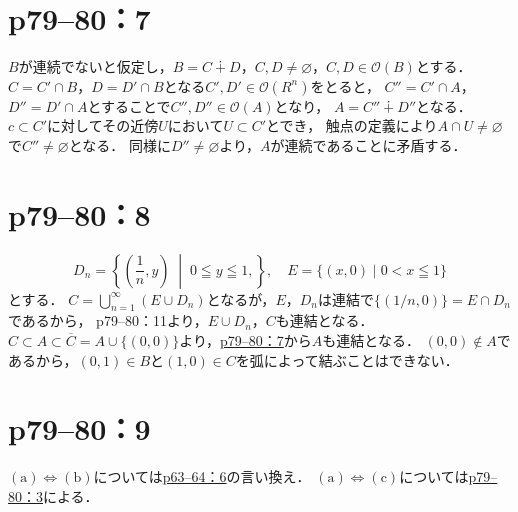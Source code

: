 \section*{p79--80：7} \label{p79--80：7}
\begin{tproof}
    $B$が連続でないと仮定し，$B=C\dotplus D$，$C, D \neq \varnothing$，$C,D\in \mathcal{O}(B)$とする．
    $C=C'\cap B$，$D=D'\cap B$となる$C',D'\in \mathcal{O}(R^n)$をとると，
    $C''=C'\cap A$，$D''=D'\cap A$とすることで$C'',D''\in \mathcal{O}(A)$となり，
    $A=C''\dotplus D''$となる．
    $c \subset C'$に対してその近傍$U$において$U\subset C'$とでき，
    触点の定義により$A\cap U\neq \varnothing$で$C''\neq \varnothing$となる．
    同様に$D''\neq \varnothing$より，$A$が連続であることに矛盾する．
\end{tproof}

\section*{p79--80：8}
\begin{tanswer}
    \[
        D_n = \left\{(\frac{1}{n},y)\; \middle| \; 0\leqq y\leqq 1,\right\}, \quad E=\{(x,0)\mid 0<x\leqq 1\}
    \]
    とする．
    $C=\bigcup_{n=1}^{\infty}\left(E\cup D_n\right)$となるが，$E$，$D_n$は連結で$\{ (1/n,0) \}= E \cap D_n$であるから，
    p79--80：11より，$E\cup D_n$，$C$も連結となる．
    $C\subset A\subset \overline{C}=A\cup\{(0,0)\}$より，\hyperref[p79--80：7]{p79--80：7}から$A$も連結となる．
    $(0,0)\notin A$であるから，$(0,1)\in B$と$(1,0)\in C$を弧によって結ぶことはできない．
\end{tanswer}

\section*{p79--80：9}
\begin{tproof}
    $(\text{a})\iff (\text{b})$については\hyperref[p63--64：6]{p63--64：6}の言い換え．
    $(\text{a})\iff  (\text{c})$については\hyperref[p79--80：3]{p79--80：3}による．
\end{tproof}


